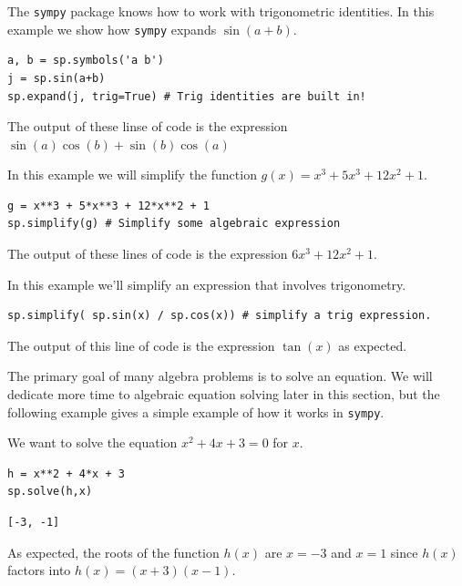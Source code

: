 \begin{example}
    The \texttt{sympy} package knows how to work with trigonometric identities.  In this
    example we show how \texttt{sympy} expands $\sin(a+b)$.

\bcode
\begin{lstlisting}
a, b = sp.symbols('a b')
j = sp.sin(a+b)
sp.expand(j, trig=True) # Trig identities are built in!
\end{lstlisting}
The output of these linse of code is the expression $\displaystyle \sin{\left(a
\right)} \cos{\left(b \right)} + \sin{\left(b \right)} \cos{\left(a \right)}$
\end{example}

\begin{example}
    In this example we will simplify the function $g(x) = x^3 + 5x^3 + 12x^2 +1$.

\bcode
\begin{lstlisting}
g = x**3 + 5*x**3 + 12*x**2 + 1
sp.simplify(g) # Simplify some algebraic expression
\end{lstlisting}
The output of these lines of code is the expression $6 x^{3} + 12 x^{2} + 1$.
\end{example}

\begin{example}
    In this example we'll simplify an expression that involves trigonometry.

\bcode
\begin{lstlisting}
sp.simplify( sp.sin(x) / sp.cos(x)) # simplify a trig expression.
\end{lstlisting}
The output of this line of code is the expression $\tan(x)$ as expected.
\end{example}

The primary goal of many algebra problems is to solve an equation.  We will dedicate more
time to algebraic equation solving later in this section, but the following example gives
a simple example of how it works in \texttt{sympy}.

\begin{example}
    We want to solve the equation $x^2 + 4x + 3 = 0$ for $x$.

\bcode
\begin{lstlisting}
h = x**2 + 4*x + 3
sp.solve(h,x)
\end{lstlisting}
\boutput
\begin{lstlisting}
[-3, -1]
\end{lstlisting}
As expected, the roots of the function $h(x)$ are $x=-3$ and $x=1$ since $h(x)$ factors
into $h(x) = (x+3)(x-1)$.
    
\end{example}


